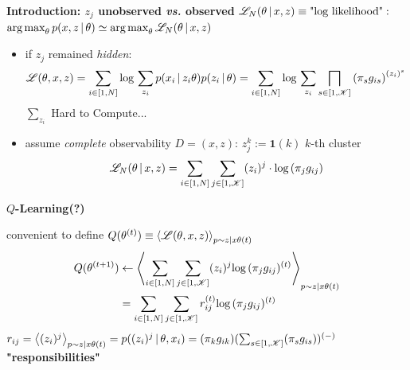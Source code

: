 \begin{frame} [t]
{\bf 
 Introduction: 
 $z_{j}$ unobserved {\it vs.} observed}
    $\mathscr {L} _{N} ( \theta \,\vert\, x, z ) 
     \equiv \text {"log likelihood"}:
    $ 
    $   
        \operatorname*{\textnormal{arg}\,\textnormal{max}} _{\theta} p ( x,z \,\vert\,  \theta )
    \simeq  
        \operatorname*{\textnormal{arg}\,\textnormal{max}} _{\theta} \mathscr {L} _{N} 
        ( \theta \,\vert\, x, z )
    $
\begin{itemize}
    \item if $z_{j}$ remained {\it hidden}:
    {\footnotesize
    \begin{gather*}
        \mathscr {L} {(\theta, x, z)}
    =
        \sum _{i \in [1, N]}
        \textnormal{log}\,  
        \sum _{z_{i}} 
        p ( x_{i} \,\vert\, z_{i} \theta )
        p ( z_{i} \,\vert\, \theta )
    =   
        \sum _{i\in [1,N]}
        \textnormal{log}\, \sum _{z _{i}} 
        \bigsqcap _{s\in [1, \mathscr {K}]}
        \qty (\pi_{s} g_{is}) 
          ^{(z_{i}) ^{s}}
    \end{gather*}   
        \alert  
        {$\sum _{z _{i}}$ Hard to Compute...}
    }
    \item
        assume {\it complete}  
        observability $D = (x, z)$: 
    $z_{j}^{k} := \mathbf{1} (k) $ $k$-th cluster 
    { \footnotesize
    \begin{align*}
        \mathscr {L} _{N} ( \theta \,\vert\, x, z )
    =
        \sum _{i \in [1, N]}
        \sum _{j \in [1, \mathscr {K}]}
        (z _{i} )^{j} \cdot 
        \textnormal{log}\, (\pi _{j} g _{ij})
    \end{align*}
    }
\end{itemize}
\end{frame} 


\begin{frame} [t]
{\bf $Q$-Learning(?)}

convenient to define  
$
    Q (\theta ^{(t)})
\equiv 
    \expval 
    { \mathscr {L} {(\theta, x, z)} } 
    _{p \sim z \vert x \theta (t)}$
\begin{align*}
    Q (\theta ^{(t+1)}) 
& \leftarrow
    \expval
    {   
        \sum _{i \in [1, N]}
        \sum _{j \in [1, \mathscr {K}]}
        (z _{i} )^{j}
        \textnormal{log}\,(\pi _{j} g _{ij}) ^{(t)}
    } 
    _{p \sim z \vert x \theta (t)}
\\
& =
    \sum _{i \in [1, N]}
        \sum _{j \in [1, \mathscr {K}]} 
    r _{ij} ^{(t)}
    \textnormal{log}\, (\pi _{j} g _{ij}) ^{(t)}
\end{align*}
    $r_{ij} = \expval
    {   
        (z_{i}) ^{j}
    } 
    _{p \sim z \vert x \theta (t)}  
=
    p ( (z _{i} )^{j} \,\vert\, \theta, x_{i} )
=
    (\pi _{k} g_{ik})
    (\sum _{s \in [1, \mathscr {K}]} 
    (\pi _{s} g_{is}) )^{(-)}
    $ 
    {\bf "responsibilities" }
\end{frame}



